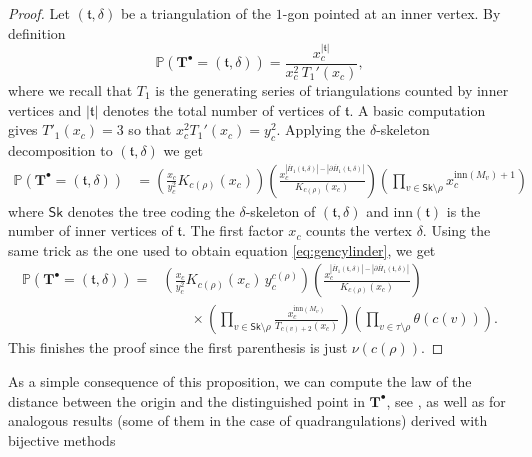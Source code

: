 \documentclass[10pt]{amsart}
\theoremstyle{definition}\newtheorem{defi}[theo]{Definition}\newtheorem{rema}[theo]{Remark}\newtheorem{exam}[theo]{Example}\newtheorem{exem}[theo]{Example}\newtheorem{nota}[theo]{Notation}
\begin{document}
\begin{proof}
Let $(\mathfrak t , \delta)$ be a triangulation of the $1$-gon pointed at an inner vertex. By definition
\[
\mathbb P \left( \mathbf{T}^{\bullet} = (\mathfrak t , \delta) \right) = \frac{x_c^{|\mathfrak t|}}{x_c^2 \, T_1'(x_c)},
\]
where we recall that $T_1$ is the generating series of triangulations counted by inner vertices and $| \mathfrak{t}|$ denotes the total number of vertices of $ \mathfrak{t}$. A basic computation gives $T'_{1}(x_{c})=3$ so that $x_c^2 T_1'(x_c) = y_c^2$. Applying the $\delta$-skeleton decomposition to $(\mathfrak t,\delta)$ we get
\begin{align*}
\mathbb P \left( \mathbf{T}^{\bullet} = (\mathfrak t , \delta) \right) & = \left( \frac{x_c}{y_c^2} K_{c(\rho)}(x_c)\right) \left( \frac{x_c^{|\overline H_1(\mathfrak{t}, \delta)|-|\partial \overline H_1(\mathfrak{t}, \delta)|}}{K_{c(\rho)}(x_c)}\right) \left( \prod_{v \in  \mathsf{Sk} \setminus \rho} x_c^{ \mathrm{inn}(M_v)+1}\right)
\end{align*}
where $ \mathsf{Sk}$ denotes the tree coding the $\delta$-skeleton of $ (\mathfrak{t}, \delta)$ and $ \mathrm{inn}( \mathfrak{t})$ is the number of inner vertices of $ \mathfrak{t}$. The first factor $x_c$ counts the vertex $\delta$. Using the same trick as the one used to obtain equation \eqref{eq:gencylinder}, we get
\begin{align*}
\mathbb P \left( \mathbf{T}^{\bullet} = (\mathfrak t , \delta) \right) = & \left( \frac{x_c}{y_c^2} K_{c(\rho)}(x_c) \, y_c^{c(\rho)}\right) \left( \frac{x_c^{|\overline H_1(\mathfrak{t}, \delta)|-|\partial \overline H_1(\mathfrak{t}, \delta)|}}{K_{c(\rho)}(x_c)}\right) \\
& \qquad \times \left( \prod_{v \in  \mathsf{Sk} \setminus \rho} \frac{x_c^{ \mathrm{inn}(M_v)}}{T_{c(v)+2}(x_c)}\right) \left( \prod_{v \in \tau \setminus \rho} \theta(c(v))\right).
\end{align*}
This finishes the proof since the first parenthesis is just $\nu(c(\rho))$.
\end{proof}

As a simple consequence of this proposition, we can compute the law of the distance between the origin and the distinguished point in $ \mathbf{T}^{\bullet}$, see \cite{BDFG03,DF05}, \cite[Proposition 2.4]{CD06} as well as \cite[Section 6.1]{BG12} for analogous results (some of them in the case of quadrangulations) derived with bijective methods
\end{document}
